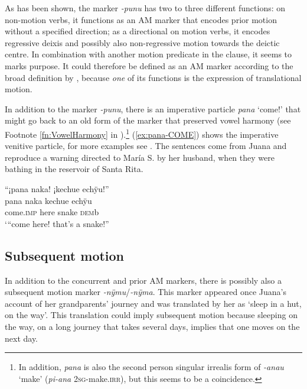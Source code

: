 As has been shown, the marker \textit{-punu} has two to three different functions: on non-motion verbs, it functions as an AM marker that encodes prior motion without a specified direction; as a directional on motion verbs, it encodes regressive deixis and possibly also non-regressive motion towards the deictic centre. In combination with another motion predicate in the clause, it seems to marks purpose. It could therefore be defined as an AM marker according to the broad definition by \citet[92]{Guillaume2016}, because \textit{one} of its functions is the expression of translational motion.

In addition to the marker \textit{-punu}, there is an imperative particle \textit{pana} ‘come!’ that might go back to an old  form of the marker that preserved vowel harmony (see Footnote \ref{fn:VowelHarmony} in ).\footnote{In addition, \textit{pana} is also the second person singular irrealis form of \textit{-anau} ‘make’ (\textit{pi-ana} 2\textsc{sg}-make.\textsc{irr}), but this seems to be a coincidence.} (\ref{ex:pana-COME}) shows the imperative venitive particle, for more examples see . The sentences come from Juana and reproduce a warning directed to María S. by her husband, when they were bathing in the reservoir of Santa Rita.

\ea\label{ex:pana-COME}
\begingl
\glpreamble “¡pana naka! ¡kechue echÿu!”\\
\gla pana naka kechue echÿu\\
\glb come.\textsc{imp} here snake \textsc{dem}b\\
\glft ‘“come here! that’s a snake!”
\endgl
\trailingcitation{[jxx-p120515l-2.164]}
\xe
{} 


\subsection{Subsequent motion}\label{sec:SubsequentMotion}

In addition to the concurrent and prior AM markers, there is possibly also a subsequent motion marker \textit{-nÿmu}/\textit{-nÿma}. This marker appeared once Juana’s account of her grandparents’ journey and was translated by her as ‘sleep in a hut, on the way’. This translation could imply subsequent motion because sleeping on the way, on a long journey that takes several days, implies that one moves on the next day.

